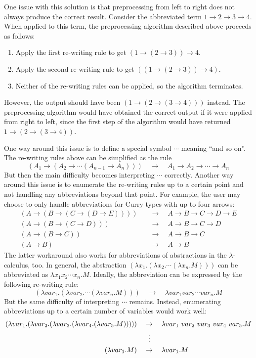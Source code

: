 One issue with this solution is that preprocessing from left to right does not always produce the correct result. Consider the abbreviated term $1 \to 2 \to 3 \to 4$. When applied to this term, the preprocessing algorithm described above proceeds as follows:
\begin{enumerate}
    \item Apply the first re-writing rule to get $(1 \to (2 \to 3)) \to 4$.
    \item Apply the second re-writing rule to get $((1 \to (2 \to 3)) \to 4)$.
    \item Neither of the re-writing rules can be applied, so the algorithm terminates.
\end{enumerate}
However, the output should have been $(1 \to (2 \to (3 \to 4)))$ instead. The preprocessing algorithm would have obtained the correct output if it were applied from right to left, since the first step of the algorithm would have returned $1 \to (2 \to (3 \to 4))$.

One way around this issue is to define a special symbol $\cdots$ meaning ``and so on''. The re-writing rules above can be simplified as the rule
\[
    (A_1 \to (A_2 \to \cdots (A_{n-1} \to A_n))) \quad \to \quad A_1 \to A_2 \to \cdots \to A_n
\]
But then the main difficulty becomes interpreting $\cdots$ correctly. Another way around this issue is to enumerate the re-writing rules up to a certain point and not handling any abbreviations beyond that point. For example, the user may choose to only handle abbreviations for Curry types with up to four arrows:
\begin{align*}
    (A \to (B \to (C \to (D \to E)))) \quad &\to \quad A \to B \to C \to D \to E \\
    (A \to (B \to (C \to D))) \quad &\to \quad A \to B \to C \to D \\
    (A \to (B \to C)) \quad &\to \quad A \to B \to C \\
    (A \to B) \quad &\to \quad A \to B
\end{align*}
The latter workaround also works for abbreviations of abstractions in the $\lambda$-calculus, too. In general, the abstraction $(\lambda x_1. (\lambda x_2. \cdots (\lambda x_n. M)))$ can be abbreviated as $\lambda x_1 x_2 \cdots x_n. M$. Ideally, the abbreviation can be expressed by the following re-writing rule:
\[
     (\lambda var_1. (\lambda var_2. \cdots (\lambda var_n. M))) \quad \to \quad \lambda var_1 var_2 \cdots var_n. M
\]
But the same difficulty of interpreting $\cdots$ remains. Instead, enumerating abbreviations up to a certain number of variables would work well:
\begin{align*}
    (\lambda var_1. (\lambda var_2. (\lambda var_3. (\lambda var_4. (\lambda var_5. M))))) \quad &\to \quad \lambda var_1\ var_2\ var_3\ var_4\ var_5. M \\
    &\vdotswithin{\to} \\
    (\lambda var_1. M) \quad &\to \quad \lambda var_1. M
\end{align*}

